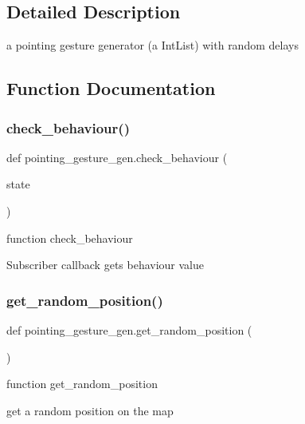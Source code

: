 \subsection{Detailed Description}
a pointing gesture generator (a Int\+List) with random delays 

\subsection{Function Documentation}
\mbox{\label{namespacepointing__gesture__gen_aa707c4f8399bd0aa948ee489b0b6206a}} 
\subsubsection{\texorpdfstring{check\+\_\+behaviour()}{check\_behaviour()}}
{\footnotesize\ttfamily def pointing\+\_\+gesture\+\_\+gen.\+check\+\_\+behaviour (\begin{DoxyParamCaption}\item[{}]{state }\end{DoxyParamCaption})}



function check\+\_\+behaviour 

Subscriber callback gets behaviour value \mbox{\label{namespacepointing__gesture__gen_aa0ae8c4b1eafa64c85ea9fd8203534d5}} 
\subsubsection{\texorpdfstring{get\+\_\+random\+\_\+position()}{get\_random\_position()}}
{\footnotesize\ttfamily def pointing\+\_\+gesture\+\_\+gen.\+get\+\_\+random\+\_\+position (\begin{DoxyParamCaption}{ }\end{DoxyParamCaption})}



function get\+\_\+random\+\_\+position 

get a random position on the map 